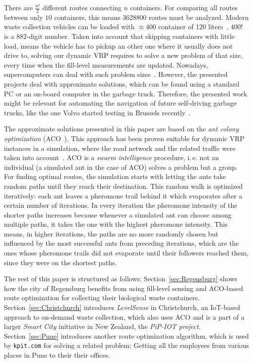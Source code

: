 \documentclass[10pt]{article}
\begin{document}
There are $\frac{n!}{2}$ different routes connecting $n$ containers. 
For comparing all routes between only $10$ containers, this means 
3628800 routes must be analyzed. Modern waste collection
vehicles can be loaded with $\approx 400$ container of 120 
liters~\cite{hyundai18}.
$400!$ is a $882$-digit number. Taken into account that skipping 
containers with little load, means the vehicle has to pickup an other
one where it usually does not drive to, solving our dynamic VRP requires
to solve a new problem of that size, every time when the fill-level
measurements are updated. Nowadays, supercomputers can deal with 
such problem sizes~\cite{Burkhovetskiy2017}. However, the
presented projects deal with approximate solutions, which
can be found using a standard PC or an on-board computer in
the garbage truck. Therefore, the presented work might be relevant 
for automating the navigation of future self-driving garbage 
trucks, like the one Volvo started testing in Brussels 
recently~\cite{volvo17}.

The approximate solutions presented in this paper are based on 
the {\it ant colony optimization} (ACO~\cite{Dorigo97}). This 
approach has been proven suitable for dynamic VRP instances
in a simulation, where the road network and the related 
traffic were taken into account~\cite{Karadimas2008}. ACO is a {\it swarm intelligence}
procedure, i.\,e. not an individual (a simulated ant in the case of 
ACO) solves a problem but a group. For finding optimal routes,
the simulation starts with letting the ants take random paths
until they reach their destination. This random walk is optimized
iteratively: each ant leaves a pheromone trail behind it which
evaporates after a certain number of iterations. In every iteration
the pheromone intensity of the shorter paths increases because
whenever a simulated ant can choose among multiple paths, it takes
the one with the highest pheromone intensity. This means, in higher
iterations, the paths are no more randomly chosen but influenced 
by the most successful ants from preceding iterations, which are
the ones whose pheromone trails did not evaporate until their 
followers reached them, since they were on the shortest paths.

The rest of this paper is structured as follows: 
Section~\ref{sec:Regensburg} shows how the city of Regensburg benefits from using 
fill-level sensing and ACO-based route optimization for collecting their biological
waste containers. 
Section~\ref{sec:Christchurch} introduces {\it LevelSense} in Christchurch, 
an IoT-based approach to on-demand waste collection, which also uses ACO and is a 
part of a larger {\it Smart City} initiative in New Zealand, the {\it PiP-IOT project}. 
Section~\ref{sec:Pune} introduces another route optimization algorithm, which is used
by {\tt kpit.com} for solving a related problem: Getting all the employees
from various places in Pune to their their offices. 
\end{document}
